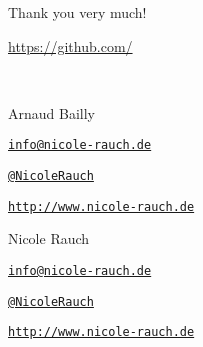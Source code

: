 \begin{frame}{Thank you very much!}

        \url{https://github.com/} 
        
        ~\\[1em]
        \begin{block}{Arnaud Bailly}
        \begin{description}[Twitterxx]
                \item[E-Mail]  \href{mailto:info@nicole-rauch.de}{\texttt{info@nicole-rauch.de}}
                \item[Twitter] \href{http://twitter.com/NicoleRauch}{\texttt{@NicoleRauch}}
                \item[Web] \href{http://www.nicole-rauch.de}{\texttt{http://www.nicole-rauch.de}}
        \end{description}
        \end{block}
        \begin{block}{Nicole Rauch}
        \begin{description}[Twitterxx]
                \item[E-Mail]  \href{mailto:info@nicole-rauch.de}{\texttt{info@nicole-rauch.de}}
                \item[Twitter] \href{http://twitter.com/NicoleRauch}{\texttt{@NicoleRauch}}
                \item[Web] \href{http://www.nicole-rauch.de}{\texttt{http://www.nicole-rauch.de}}
        \end{description}
        \end{block}
\end{frame}

